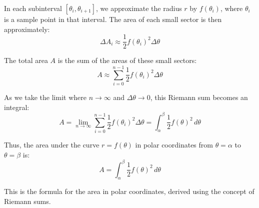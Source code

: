 \documentclass{report}
\begin{document}
In each subinterval \( [ \theta_i, \theta_{i+1} ] \), we approximate the radius \( r \) by \( f(\theta_i) \), where \( \theta_i \) is a sample point in that interval. The area of each small sector is then approximately:
\[
	\Delta A_i \approx \frac{1}{2} f(\theta_i)^2 \Delta \theta
\]

The total area \( A \) is the sum of the areas of these small sectors:
\[
	A \approx \sum_{i=0}^{n-1} \frac{1}{2} f(\theta_i)^2 \Delta \theta
\]

As we take the limit where \( n \to \infty \) and \( \Delta \theta \to 0 \), this Riemann sum becomes an integral:
\[
	A = \lim_{n \to \infty} \sum_{i=0}^{n-1} \frac{1}{2} f(\theta_i)^2 \Delta \theta = \int_{\alpha}^{\beta} \frac{1}{2} f(\theta)^2 \, d\theta
\]

Thus, the area under the curve \( r = f(\theta) \) in polar coordinates from \( \theta = \alpha \) to \( \theta = \beta \) is:
\[
	\boxed{A = \int_{\alpha}^{\beta} \frac{1}{2} f(\theta)^2 \, d\theta}
\]

This is the formula for the area in polar coordinates, derived using the concept of Riemann sums.

\end{document}
